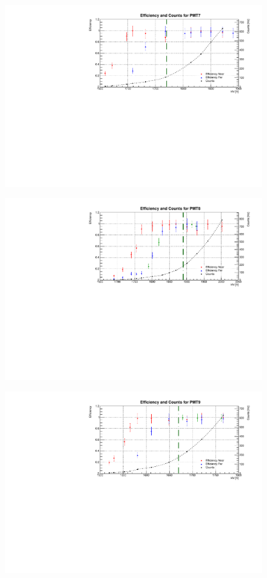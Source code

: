 \begin{figure}[h]
	\centerline{\includegraphics[scale=0.9]{img/eff/eff7.pdf}}
\end{figure}
\begin{figure}[h]
	\centerline{\includegraphics[scale=0.9]{img/eff/eff8.pdf}}
\end{figure}
\begin{figure}[h]
	\centerline{\includegraphics[scale=0.9]{img/eff/eff9.pdf}}
\end{figure}
